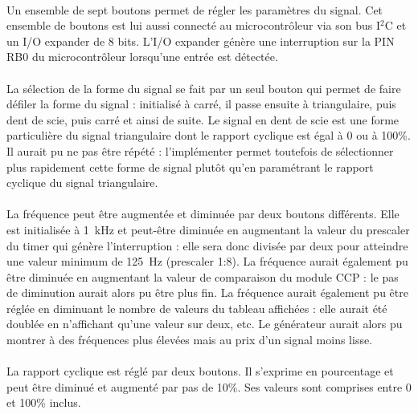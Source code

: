 \documentclass{article}
\begin{document}
    \paragraph{}
    Un ensemble de sept boutons permet de régler les paramètres du signal. Cet ensemble de boutons est lui aussi connecté au microcontrôleur via son bus I$^2$C et un I/O expander de 8 bits. L'I/O expander génère une interruption sur la PIN RB0 du microcontrôleur lorsqu'une entrée est détectée.

    \paragraph{}
    La sélection de la forme du signal se fait par un seul bouton qui permet de faire défiler la forme du signal : initialisé à carré, il passe ensuite à triangulaire, puis dent de scie, puis carré et ainsi de suite. Le signal en dent de scie est une forme particulière du signal triangulaire dont le rapport cyclique est égal à 0 ou à 100\%. Il aurait pu ne pas être répété : l'implémenter permet toutefois de sélectionner plus rapidement cette forme de signal plutôt qu'en paramétrant le rapport cyclique du signal triangulaire.

    \paragraph{}
    La fréquence peut être augmentée et diminuée par deux boutons différents. Elle est initialisée à \SI{1}{\kilo\hertz} et peut-être diminuée en augmentant la valeur du prescaler du timer qui génère l'interruption : elle sera donc divisée par deux pour atteindre une valeur minimum de \SI{125}{\hertz} (prescaler 1:8). La fréquence aurait également pu être diminuée en augmentant la valeur de comparaison du module CCP : le pas de diminution aurait alors pu être plus fin. La fréquence aurait également pu être réglée en diminuant le nombre de valeurs du tableau affichées : elle aurait été doublée en n'affichant qu'une valeur sur deux, etc. Le générateur aurait alors pu montrer à des fréquences plus élevées mais au prix d'un signal moins lisse.

    \paragraph{}
    La rapport cyclique est réglé par deux boutons. Il s'exprime en pourcentage et peut être diminué et augmenté par pas de 10\%. Ses valeurs sont comprises entre 0 et 100\% inclus.
\end{document}
